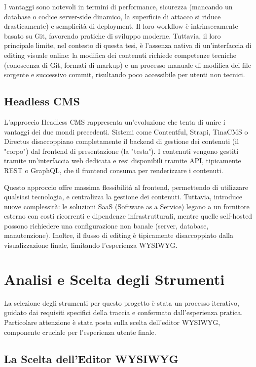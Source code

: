 I vantaggi sono notevoli in termini di performance, sicurezza (mancando un database o codice server-side dinamico, la superficie di attacco si riduce drasticamente) e semplicità di deployment. Il loro workflow è intrinsecamente basato su Git, favorendo pratiche di sviluppo moderne. Tuttavia, il loro principale limite, nel contesto di questa tesi, è l'assenza nativa di un'interfaccia di editing visuale online: la modifica dei contenuti richiede competenze tecniche (conoscenza di Git, formati di markup) e un processo manuale di modifica dei file sorgente e successivo commit, risultando poco accessibile per utenti non tecnici.

\subsection{Headless CMS}
L'approccio Headless CMS rappresenta un'evoluzione che tenta di unire i vantaggi dei due mondi precedenti. Sistemi come Contentful, Strapi, TinaCMS o Directus disaccoppiano completamente il backend di gestione dei contenuti (il "corpo") dal frontend di presentazione (la "testa"). I contenuti vengono gestiti tramite un'interfaccia web dedicata e resi disponibili tramite API, tipicamente REST o GraphQL, che il frontend consuma per renderizzare i contenuti.

Questo approccio offre massima flessibilità al frontend, permettendo di utilizzare qualsiasi tecnologia, e centralizza la gestione dei contenuti. Tuttavia, introduce nuove complessità: le soluzioni SaaS (Software as a Service) legano a un fornitore esterno con costi ricorrenti e dipendenze infrastrutturali, mentre quelle self-hosted possono richiedere una configurazione non banale (server, database, manutenzione). Inoltre, il flusso di editing è tipicamente disaccoppiato dalla visualizzazione finale, limitando l'esperienza WYSIWYG.

\section{Analisi e Scelta degli Strumenti}

La selezione degli strumenti per questo progetto è stata un processo iterativo, guidato dai requisiti specifici della traccia e confermato dall'esperienza pratica. Particolare attenzione è stata posta sulla scelta dell'editor WYSIWYG, componente cruciale per l'esperienza utente finale.

\subsection{La Scelta dell'Editor WYSIWYG}

